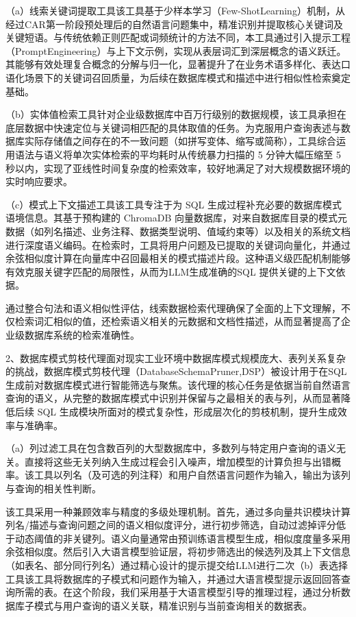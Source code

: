 \documentclass[12pt,a4paper,openright,UTF8]{ctexbook}
\begin{document}
（a）线索关键词提取工具该工具基于少样本学习（Few-ShotLearning）机制，从经过CAR第一阶段预处理后的自然语言问题集中，精准识别并提取核心关键词及关键短语。与传统依赖正则匹配或词频统计的方法不同，本工具通过引入提示工程（PromptEngineering）与上下文示例，实现从表层词汇到深层概念的语义跃迁。其能够有效处理复合概念的分解与归一化，显著提升了在业务术语多样化、表达口语化场景下的关键词召回质量，为后续在数据库模式和描述中进行相似性检索奠定基础。


（b）实体值检索工具针对企业级数据库中百万行级别的数据规模，该工具承担在底层数据中快速定位与关键词相匹配的具体取值的任务。为克服用户查询表述与数据库实际存储值之间存在的不一致问题（如拼写变体、缩写或简称），工具综合运用语法与语义将单次实体检索的平均耗时从传统暴力扫描的 5 分钟大幅压缩至 5 秒以内，实现了亚线性时间复杂度的检索效率，较好地满足了对大规模数据环境的实时响应要求。


（c）模式上下文描述工具该工具专注于为 SQL 生成过程补充必要的数据库模式语境信息。其基于预构建的 ChromaDB 向量数据库，对来自数据库目录的模式元数据（如列名描述、业务注释、数据类型说明、值域约束等）以及相关的系统文档进行深度语义编码。在检索时，工具将用户问题及已提取的关键词向量化，并通过余弦相似度计算在向量库中召回最相关的模式描述片段。这种语义级匹配机制能够有效克服关键字匹配的局限性，从而为LLM生成准确的SQL 提供关键的上下文依据。


通过整合句法和语义相似性评估，线索数据检索代理确保了全面的上下文理解，不仅检索词汇相似的值，还检索语义相关的元数据和文档性描述，从而显著提高了企业级数据库系统的检索准确性。


2、数据库模式剪枝代理面对现实工业环境中数据库模式规模庞大、表列关系复杂的挑战，数据库模式剪枝代理（DatabaseSchemaPruner,DSP）被设计用于在SQL生成前对数据库模式进行智能筛选与聚焦。该代理的核心任务是依据当前自然语言查询的语义，从完整的数据库模式中识别并保留与之最相关的表与列，从而显著降低后续 SQL 生成模块所面对的模式复杂性，形成层次化的剪枝机制，提升生成效率与准确率。


（a）列过滤工具在包含数百列的大型数据库中，多数列与特定用户查询的语义无关。直接将这些无关列纳入生成过程会引入噪声，增加模型的计算负担与出错概率。该工具以列名（及可选的列注释）和用户自然语言问题作为输入，输出为该列与查询的相关性判断。


该工具采用一种兼顾效率与精度的多级处理机制。首先，通过多向量共识模块计算列名/描述与查询问题之间的语义相似度评分，进行初步筛选，自动过滤掉评分低于动态阈值的非关键列。语义向量通常由预训练语言模型生成，相似度度量多采用余弦相似度。然后引入大语言模型验证层，将初步筛选出的候选列及其上下文信息（如表名、部分同行列名）通过精心设计的提示提交给LLM进行二次（b）表选择工具该工具将数据库的子模式和问题作为输入，并通过大语言模型提示返回回答查询所需的表。在这个阶段，我们采用基于大语言模型引导的推理过程，通过分析数据库子模式与用户查询的语义关联，精准识别与当前查询相关的数据表。
\end{document}
